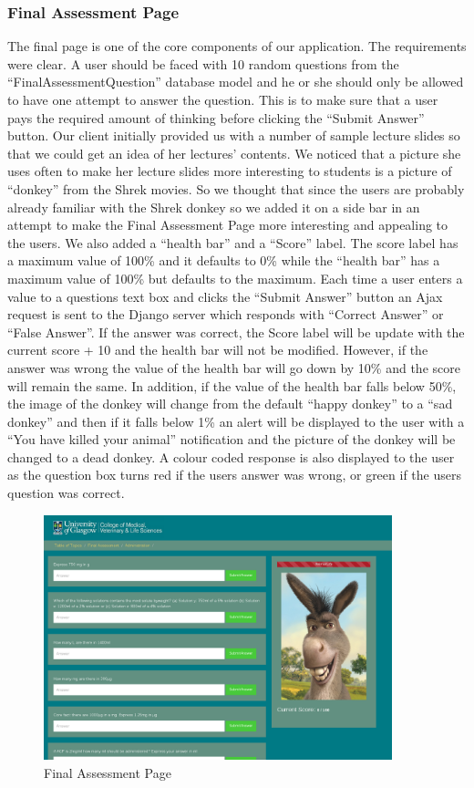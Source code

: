 \documentclass{l3proj}
\begin{document}
{\subsubsection{Final Assessment Page}
The final page is one of the core components of our application. The requirements were clear. A user should be faced with 10 random questions from the “FinalAssessmentQuestion” database model and he or she should only be allowed to have one attempt to answer the question. This is to make sure that a user pays the required amount of thinking before clicking the “Submit Answer” button. Our client initially provided us with a number of sample lecture slides so that we could get an idea of her lectures’ contents. We noticed that a picture she uses often to make her lecture slides more interesting to students is a picture of “donkey” from the Shrek movies. So we thought that since the users are probably already familiar with the Shrek donkey so we added it on a side bar in an attempt to make the Final Assessment Page more interesting and appealing to the users. We also added a “health bar” and a “Score” label. The score label has a maximum value of 100\% and it defaults to 0\% while the “health bar” has a maximum value of 100\% but defaults to the maximum. Each time a user enters a value to a questions text box and clicks the “Submit Answer” button an Ajax request is sent to the Django server which responds with “Correct Answer” or “False Answer”. If the answer was correct, the Score label will be update with the current score + 10 and the health bar will not be modified. However, if the answer was wrong the value of the health bar will go down by 10\% and the score will remain the same.  In addition, if the value of the health bar falls below 50\%, the image of the donkey will change from the default “happy donkey” to a “sad donkey” and then if it falls below 1\% an alert will be displayed to the user with a “You have killed your animal” notification and the picture of the donkey will be changed to a dead donkey.  A colour coded response is also displayed to the user as the question box turns red if the users answer was wrong, or green if the users question was correct. 
\begin{figure}[!htb]
\caption{Final Assessment Page}
 \centering
\includegraphics[width=0.9\textwidth]{images/finalAssessmentPage.png}
\end{figure}
}
\end{document}
